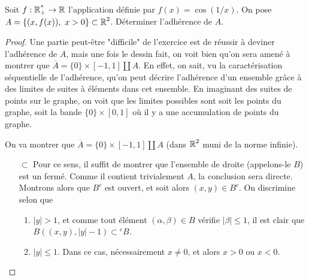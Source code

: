 \documentclass[10pt]{scrartcl}
\begin{document}
    \newpage 
    \begin{exo}
        Soit $f:\operatorname{\mathbb R_+^*}\to\operatorname{\mathbb R}$ l'application définie par $f(x)=\cos(1/x)$. 
        On pose $A=\lbrace (x,f(x)),\ x>0\rbrace\subset\R^2$. Déterminer l'adhérence de $A$.
    \end{exo}

    \begin{proof}
        Une partie peut-être "difficile" de l'exercice est de réussir à deviner l'adhérence de $A$, mais une fois le dessin fait, on voit bien qu'on sera amené à montrer que $\overline A= \lbrace 0\rbrace\times[-1,1]\coprod A$.
        En effet, on sait, vu la caractérisation séquentielle de l'adhérence, qu'on peut décrire l'adhérence d'un ensemble grâce à des limites de suites à éléments dans cet ensemble. 
        En imaginant des suites de points sur le graphe, on voit que les limites possibles sont soit les points du graphe, soit la bande $\lbrace 0\rbrace\times [0,1]$ où il y a une accumulation de points du graphe.
        \begin{center}
        \end{center}
        On va montrer que $\overline A= \lbrace 0\rbrace\times[-1,1]\coprod A$ (dans $\operatorname{\mathbb R}^2$ muni de la norme infinie).
        \begin{itemize}
            \item[$\boxed{\subset}$] Pour ce sens, il suffit de montrer que l'ensemble de droite (appelons-le $B$) est un fermé.
                Comme il contient trivialement $A$, la conclusion sera directe. Montrons alors que $B^c$ est ouvert, et soit alors $(x,y)\in B^c$.
                On discrimine selon que 
                \begin{enumerate}[1.]
                    \item $|y|>1$, et comme tout élément $(\alpha,\beta)\in B$ vérifie $|\beta|\leq 1$, il est clair que $B((x,y),|y|-1)\subset {}^cB$.
                    \item $|y|\leq 1$. Dans ce cas, nécessairement $x\neq 0$, et alors $x>0$ ou $x<0$.

\end{enumerate}
\end{itemize}
\end{proof}
\end{document}
